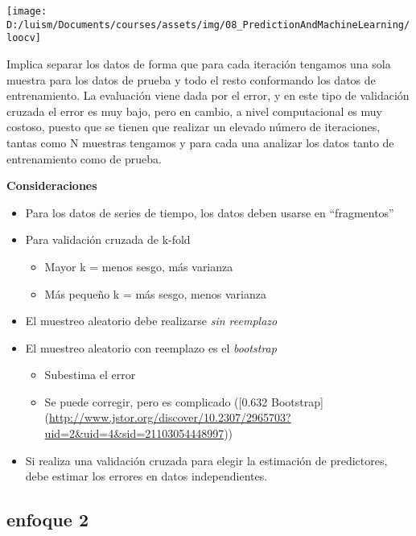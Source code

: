 \documentclass[
]{article}
\providecommand{\tightlist}{%
  \setlength{\itemsep}{0pt}\setlength{\parskip}{0pt}}
\begin{document}
\begin{center}\texttt{[image: D:/luism/Documents/courses/assets/img/08\_PredictionAndMachineLearning/loocv]} \end{center}

Implica separar los datos de forma que para cada iteración tengamos una
sola muestra para los datos de prueba y todo el resto conformando los
datos de entrenamiento. La evaluación viene dada por el error, y en este
tipo de validación cruzada el error es muy bajo, pero en cambio, a nivel
computacional es muy costoso, puesto que se tienen que realizar un
elevado número de iteraciones, tantas como N muestras tengamos y para
cada una analizar los datos tanto de entrenamiento como de prueba.

\textbf{Consideraciones}

\begin{itemize}
\tightlist
\item
  Para los datos de series de tiempo, los datos deben usarse en
  ``fragmentos''
\item
  Para validación cruzada de k-fold

  \begin{itemize}
  \tightlist
  \item
    Mayor k = menos sesgo, más varianza
  \item
    Más pequeño k = más sesgo, menos varianza
  \end{itemize}
\item
  El muestreo aleatorio debe realizarse \emph{sin reemplazo}
\item
  El muestreo aleatorio con reemplazo es el \emph{bootstrap}

  \begin{itemize}
  \tightlist
  \item
    Subestima el error
  \item
    Se puede corregir, pero es complicado ({[}0.632 Bootstrap{]}
    (\url{http://www.jstor.org/discover/10.2307/2965703?uid=2\&uid=4\&sid=21103054448997}))
  \end{itemize}
\item
  Si realiza una validación cruzada para elegir la estimación de
  predictores, debe estimar los errores en datos independientes.
\end{itemize}

\hypertarget{enfoque-2}{%
\subsection{enfoque 2}\label{enfoque-2}}
\end{document}

